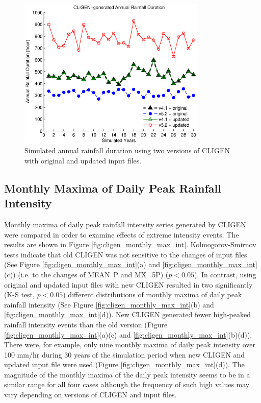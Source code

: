 \begin{figure}[htbp]
  \centering

\includegraphics[width=0.8\textwidth]{./img/cligen_annual_duration_series}
  \caption{Simulated annual rainfall duration using two versions of CLIGEN
with original and updated input files.}
  \label{fig:cligen_annual_duration}
\end{figure}

\subsection{Monthly Maxima of Daily Peak Rainfall Intensity}
Monthly maxima of daily peak rainfall intensity series generated by CLIGEN were
compared in order to examine effects of extreme intensity events. The results
are shown in Figure \ref{fig:cligen_monthly_max_int}.
Kolmogorov-Smirnov tests indicate that old CLIGEN was not sensitive to the
changes of input files (See Figure \ref{fig:cligen_monthly_max_int}(a) and
\ref{fig:cligen_monthly_max_int}(c)) (i.e. to the changes of MEAN~P and MX~.5P)
($p<0.05$). In contrast, using original and updated input files with new CLIGEN
resulted in two significantly (K-S test, $p<0.05$) different distributions of
monthly maxima of daily peak rainfall intensity (See Figure
\ref{fig:cligen_monthly_max_int}(b) and \ref{fig:cligen_monthly_max_int}(d)).
New CLIGEN generated fewer high-peaked rainfall intensity events than the old
version (Figure \ref{fig:cligen_monthly_max_int}(a)(c) and
\ref{fig:cligen_monthly_max_int}(b)(d)). There were, for example, only nine
monthly maxima of daily peak intensity over 100 mm/hr during 30 years of the
simulation period when new CLIGEN and updated input file were used (Figure
\ref{fig:cligen_monthly_max_int}(d)). The magnitude of the monthly maxima of the
daily peak intensity seems to be in a similar range for all four cases although
the frequency of such high values may vary depending on versions of CLIGEN and
input files.

